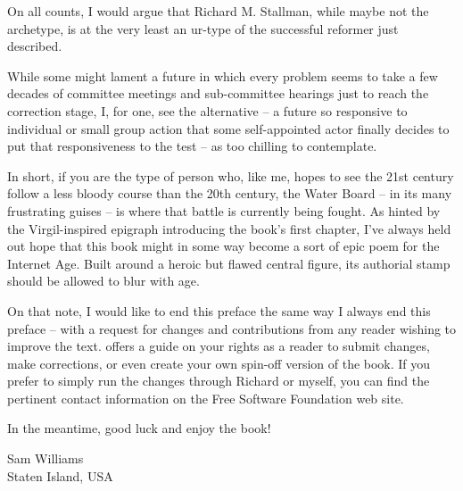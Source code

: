 On all counts, I would argue that Richard M. Stallman, while maybe not  
the archetype, is at the very least an ur-type of the successful  
reformer just described.

While some might lament a future in which every problem seems to take  
a few decades of committee meetings and sub-committee hearings just to  
reach the correction stage, I, for one, see the alternative  -- a  
future so responsive to individual or small group action that some  
self-appointed actor finally decides to put that responsiveness to the  
test -- as too chilling to contemplate.

In short, if you are the type of person who, like me, hopes to see the
21st century follow a less bloody course than the 20th century, the
Water Board -- in its many frustrating guises -- is where that battle
is currently being fought. As hinted by the Virgil-inspired epigraph
introducing the book's first chapter, I've always held out hope that
this book might in some way become a sort of epic poem for the
Internet Age. Built around a heroic but flawed central figure, its
authorial stamp should be allowed to blur with age.

On that note, I would like to end this preface the same way I always
end this preface -- with a request for changes and contributions from
any reader wishing to improve the text.  offers a
guide on your rights as a reader to submit changes, make corrections,
or even create your own spin-off version of the book. If you prefer to
simply run the changes through Richard or myself, you can find the
pertinent contact information on the Free Software Foundation web site.

In the meantime, good luck and enjoy the book!

\vspace{0.5in}
\noindent Sam Williams\\
\noindent Staten Island, USA
